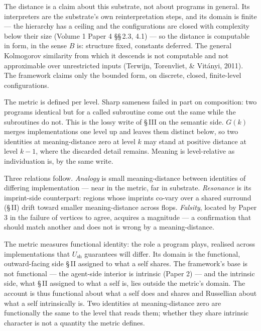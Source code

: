 \documentclass[11pt,oneside]{report}
\theoremstyle{definition}
\theoremstyle{remark}
\begin{document}
The distance is a claim about this substrate, not about programs in general.
Its interpreters are the substrate's own reinterpretation steps, and its domain
is finite --- the hierarchy has a ceiling and the configurations are closed
with complexity below their size (Volume 1 Paper 4 \S\S\,2.3, 4.1) --- so the
distance is computable in form, in the sense \ensuremath{B} is: structure
fixed, constants deferred. The general Kolmogorov similarity from which it
descends is not computable and not approximable over unrestricted inputs
(Terwijn, Torenvliet, \& Vit\'anyi, 2011). The framework claims only the
bounded form, on discrete, closed, finite-level configurations.

The metric is defined per level. Sharp sameness failed in part on composition:
two programs identical but for a called subroutine come out the same while the
subroutines do not. This is the lossy write of \S\,III on the semantic side.
\ensuremath{G(k)} merges implementations one level up and leaves them distinct
below, so two identities at meaning-distance zero at level \ensuremath{k} may
stand at positive distance at level \ensuremath{k-1}, where the discarded
detail remains. Meaning is level-relative as individuation is, by the same
write.

Three relations follow. \emph{Analogy} is small meaning-distance between
identities of differing implementation --- near in the metric, far in
substrate. \emph{Resonance} is its imprint-side counterpart: regions whose
imprints co-vary over a shared surround (\S\,II) drift toward smaller
meaning-distance across flops. \emph{Falsity}, located by Paper 3 in the
failure of vertices to agree, acquires a magnitude --- a confirmation that
should match another and does not is wrong by a meaning-distance.

The metric measures functional identity: the role a program plays, realised
across implementations that \ensuremath{U_{\mathrm{sh}}} guarantees will differ.
Its domain is the functional, outward-facing side \S\,II assigned to what a
self shares. The framework's base is not functional --- the agent-side
interior is intrinsic (Paper 2) --- and the intrinsic side, what \S\,II
assigned to what a self is, lies outside the metric's domain. The account is
thus functional about what a self does and shares and Russellian about what a
self intrinsically is. Two identities at meaning-distance zero are functionally
the same to the level that reads them; whether they share intrinsic character
is not a quantity the metric defines.
\end{document}
